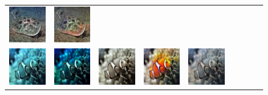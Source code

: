 \begin{figure}[t]
\begin{center}
\begin{tabular}{ccccccccc}
			\includegraphics[width = 0.10\linewidth,height=0.10\linewidth]{figures/ch3/compare/EUVP/Ushape/265613_n01496331_8134.JPEG} & \hspace{-0.40cm}         
			\includegraphics[width = 0.10\linewidth,height=0.10\linewidth]{figures/ch3/compare/EUVP/Ours/265613_n01496331_8134..png}   \\

            \includegraphics[width = 0.10\linewidth,height=0.10\linewidth]{figures/ch3/compare/EUVP/Input/264298_00035269.jpg}  & \hspace{-0.40cm}
			\includegraphics[width = 0.10\linewidth,height=0.10\linewidth]{figures/ch3/compare/EUVP/UDCP/264298_00035269.jpg}   & \hspace{-0.40cm}
			\includegraphics[width = 0.10\linewidth,height=0.10\linewidth]{figures/ch3/compare/EUVP/UGAN/264298_00035269.jpg}   & \hspace{-0.40cm}
			\includegraphics[width = 0.10\linewidth,height=0.10\linewidth]{figures/ch3/compare/EUVP/FGAN/264298_00035269.jpg}   & \hspace{-0.40cm}
			\includegraphics[width = 0.10\linewidth,height=0.10\linewidth]{figures/ch3/compare/EUVP/UWCNN/264298_00035269.jpg}  & \hspace{-0.40cm}

\end{tabular}
\end{center}
\end{figure}
